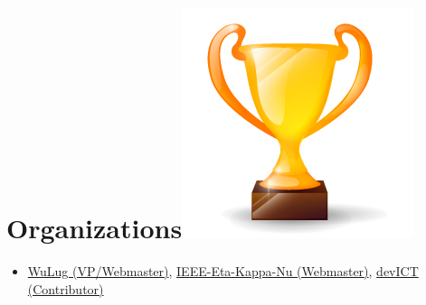 \documentclass[letterpaper]{twentysecondcv} %
\begin{document}
\section{Organizations{\includegraphics[scale=0.05]{img/trophy.png}}}
\begin{itemize}
    \item \href{https://www.facebook.com/wulug/}{WuLug (VP/Webmaster)}, \href{http://webs.wichita.edu/?u=hkn_epsilonxi&p=/hkn_members/current_officers_spring2017/}{IEEE-Eta-Kappa-Nu (Webmaster)}, \href{https://devict.org/}{devICT (Contributor)}
\end{itemize}
\end{document}
